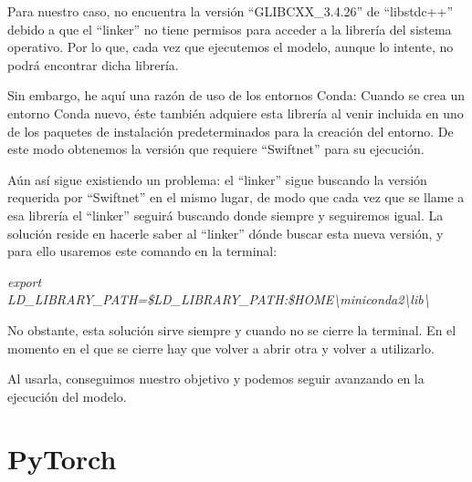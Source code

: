 Para nuestro caso, no encuentra la versión ``GLIBCXX\_3.4.26'' de ``libstdc++'' debido a que el ``linker'' no tiene permisos para acceder a la librería del sistema operativo. Por lo que, cada vez que ejecutemos el modelo, aunque lo intente, no podrá encontrar dicha librería.

Sin embargo, he aquí una razón de uso de los entornos Conda: Cuando se crea un entorno Conda nuevo, éste también adquiere esta librería al venir incluida en uno de los paquetes de instalación predeterminados para la creación del entorno. De este modo obtenemos la versión que requiere ``Swiftnet'' para su ejecución.

Aún así sigue existiendo un problema: el ``linker'' sigue buscando la versión requerida por ``Swiftnet'' en el mismo lugar, de modo que cada vez que se llame a esa librería el ``linker'' seguirá buscando donde siempre y seguiremos igual. La solución reside en hacerle saber al ``linker'' dónde buscar esta nueva versión, y para ello usaremos este comando en la terminal:

\begin{center}
\textit{export LD\_LIBRARY\_PATH=\$LD\_LIBRARY\_PATH:\$HOME\textbackslash{miniconda2}\textbackslash{lib}\textbackslash{}}
\end{center}

No obstante, esta solución sirve siempre y cuando no se cierre la terminal. En el momento en el que se cierre hay que volver a abrir otra y volver a utilizarlo.

Al usarla, conseguimos nuestro objetivo y podemos seguir avanzando en la ejecución del modelo.

\section{PyTorch}






